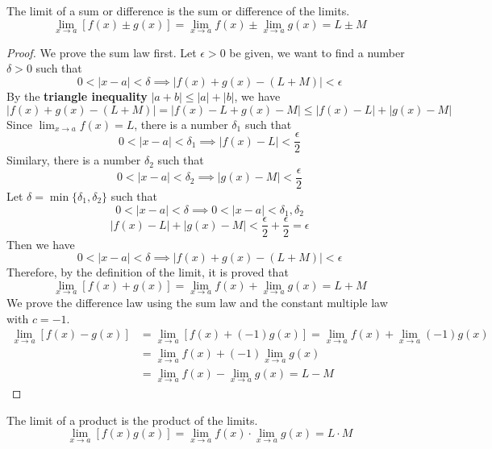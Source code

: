 \begin{theorem}
    The limit of a sum or difference is the sum or difference of the limits.
    \[\lim_{x\to a}[f(x)\pm g(x)]=\lim_{x\to a}f(x)\pm\lim_{x\to a}g(x)=L\pm M\]
\end{theorem}
\begin{proof}
    We prove the sum law first.
    Let \(\epsilon>0\) be given, we want to find a number \(\delta>0\) such
    that \[0<|x-a|<\delta\implies|f(x)+g(x)-(L+M)|<\epsilon\]
    By the \textbf{triangle inequality} \(|a+b|\leq|a|+|b|\), we have
    \[|f(x)+g(x)-(L+M)|=|f(x)-L+g(x)-M|\leq|f(x)-L|+|g(x)-M|\]
    Since \(\lim_{x\to a}f(x)=L\), there is a number \(\delta_1\) such that
    \[0<|x-a|<\delta_1\implies|f(x)-L|<\frac{\epsilon}{2}\]
    Similary, there is a number \(\delta_2\) such that
    \[0<|x-a|<\delta_2\implies|g(x)-M|<\frac{\epsilon}{2}\]
    Let \(\delta=\min\{\delta_1,\delta_2\}\) such that
    \[0<|x-a|<\delta\implies0<|x-a|<\delta_1,\delta_2\]
    \[|f(x)-L|+|g(x)-M|<\frac{\epsilon}{2}+\frac{\epsilon}{2}=\epsilon\]
    Then we have \[0<|x-a|<\delta\implies|f(x)+g(x)-(L+M)|<\epsilon\]
    Therefore, by the definition of the limit, it is proved that
    \[\lim_{x\to a}[f(x)+g(x)]=\lim_{x\to a}f(x)+\lim_{x\to a}g(x)=L+M\]
    We prove the difference law using the sum law and the constant multiple
    law with \(c=-1\).
    \begin{align*}
        \lim_{x\to a}[f(x)-g(x)]&=\lim_{x\to a}[f(x)+(-1)g(x)]
        =\lim_{x\to a}f(x)+\lim_{x\to a}(-1)g(x) \\
        &=\lim_{x\to a}f(x)+(-1)\lim_{x\to a}g(x) \\
        &=\lim_{x\to a}f(x)-\lim_{x\to a}g(x) = L-M
    \end{align*}
\end{proof}
\begin{theorem}
    The limit of a product is the product of the limits.
    \[\lim_{x\to a}[f(x)g(x)]=\lim_{x\to a}f(x)\cdot\lim_{x\to a}g(x)=L\cdot M\]
\end{theorem}
